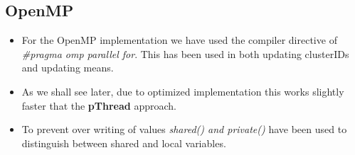 \documentclass[letter, 11pt, margin=1in]{article}
\begin{document}
\subsection{OpenMP}

\begin{itemize}
    \item For the OpenMP implementation we have used the compiler directive of \textit{#pragma omp parallel for}. This has been used in both updating clusterIDs and updating means.
    \item As we shall see later, due to optimized implementation this works slightly faster that the \textbf{pThread} approach.
    \item To prevent over writing of values \textit{shared() and private()} have been used to distinguish between shared and local variables.
\end{itemize}
\end{document}
